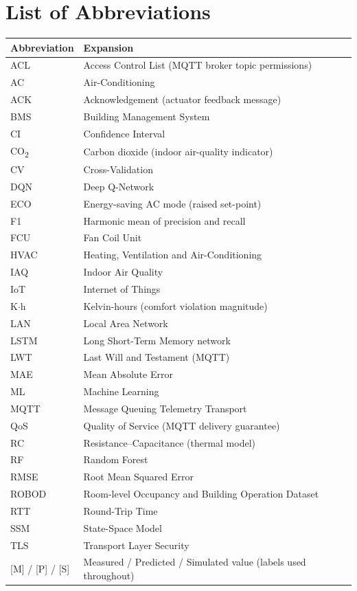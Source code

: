 \documentclass[12pt,a4paper,oneside]{report}
\newcommand{\COtwo}{CO\textsubscript{2}}
\begin{document}
\chapter*{List of Abbreviations}
\begin{longtable}{@{}L{3.2cm}L{11.5cm}@{}}
\toprule
\textbf{Abbreviation} & \textbf{Expansion}\\
\midrule
\endhead
ACL & Access Control List (MQTT broker topic permissions)\\
AC & Air-Conditioning\\
ACK & Acknowledgement (actuator feedback message)\\
BMS & Building Management System\\
CI & Confidence Interval\\
\COtwo{} & Carbon dioxide (indoor air-quality indicator)\\
CV & Cross-Validation\\
DQN & Deep Q-Network\\
ECO & Energy-saving AC mode (raised set-point)\\
F1 & Harmonic mean of precision and recall\\
FCU & Fan Coil Unit\\
HVAC & Heating, Ventilation and Air-Conditioning\\
IAQ & Indoor Air Quality\\
IoT & Internet of Things\\
K$\cdot$h & Kelvin-hours (comfort violation magnitude)\\
LAN & Local Area Network\\
LSTM & Long Short-Term Memory network\\
LWT & Last Will and Testament (MQTT)\\
MAE & Mean Absolute Error\\
ML & Machine Learning\\
MQTT & Message Queuing Telemetry Transport\\
QoS & Quality of Service (MQTT delivery guarantee)\\
RC & Resistance--Capacitance (thermal model)\\
RF & Random Forest\\
RMSE & Root Mean Squared Error\\
ROBOD & Room-level Occupancy and Building Operation Dataset\\
RTT & Round-Trip Time\\
SSM & State-Space Model\\
TLS & Transport Layer Security\\
{[M] / [P] / [S]} & Measured / Predicted / Simulated value (labels used throughout)\\
\bottomrule
\end{longtable}
\end{document}
